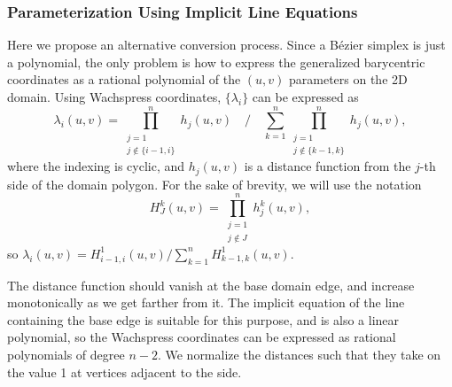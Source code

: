\documentclass[9pt,academicons]{article}
\begin{document}
\subsubsection{Parameterization Using Implicit Line Equations}
\label{subsubsec:parameters}
Here we propose an alternative conversion process. Since a B\'ezier simplex is just a polynomial,
the only problem is how to express the generalized barycentric coordinates as a rational polynomial
of the $(u,v)$ parameters on the 2D domain. Using Wachspress coordinates,
$\{\lambda_i\}$ can be expressed as
\begin{equation}
  \label{eq:wachspress}
  \lambda_i(u,v) = \prod_{\substack{j=1\\j\notin\{i-1,i\}}}^nh_j(u,v) \quad\bigg/\quad
                   \sum_{k=1}^n\prod_{\substack{j=1\\j\notin\{k-1,k\}}}^nh_j(u,v),
\end{equation}
where the indexing is cyclic, and $h_j(u,v)$ is a distance function
from the $j$-th side of the domain polygon. For the sake of brevity,
we will use the notation
\begin{equation}
  \label{eq:prod-h}
  H_J^k(u,v)=\prod_{\substack{j=1\\j\notin{J}}}^nh_j^k(u,v),
\end{equation}
so $\lambda_i(u,v)=H_{i-1,i}^1(u,v)/\sum_{k=1}^nH_{k-1,k}^1(u,v)$.

The distance function should vanish at the base domain edge, and increase monotonically
as we get farther from it.
The implicit
equation of the line containing the base edge is suitable for this purpose,
and is also a linear polynomial,
so the Wachspress coordinates can be expressed as rational polynomials of degree $n-2$. We
normalize the distances such that they take on the value 1 at vertices adjacent to the side.
\end{document}
